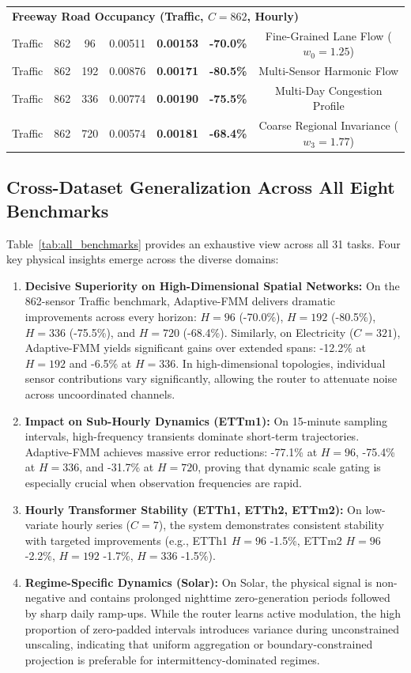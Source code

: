 \documentclass[journal]{IEEEtran}
\begin{document}
\begin{table}[!t]
\begin{tabular}{lcccccc}
\midrule
\multicolumn{7}{l}{\textbf{Freeway Road Occupancy (Traffic, $C=862$, Hourly)}} \\
Traffic & 862 & 96 & 0.00511 & \textbf{0.00153} & \textbf{-70.0\%} & Fine-Grained Lane Flow ($w_0 = 1.25$) \\
Traffic & 862 & 192 & 0.00876 & \textbf{0.00171} & \textbf{-80.5\%} & Multi-Sensor Harmonic Flow \\
Traffic & 862 & 336 & 0.00774 & \textbf{0.00190} & \textbf{-75.5\%} & Multi-Day Congestion Profile \\
Traffic & 862 & 720 & 0.00574 & \textbf{0.00181} & \textbf{-68.4\%} & Coarse Regional Invariance ($w_3 = 1.77$) \\
\bottomrule
\end{tabular}
\end{table}

\subsection{Cross-Dataset Generalization Across All Eight Benchmarks}
Table~\ref{tab:all_benchmarks} provides an exhaustive view across all 31 tasks. Four key physical insights emerge across the diverse domains:
\begin{enumerate}
\item \textbf{Decisive Superiority on High-Dimensional Spatial Networks:} On the 862-sensor Traffic benchmark, Adaptive-FMM delivers dramatic improvements across every horizon: $H=96$ (-70.0\%), $H=192$ (-80.5\%), $H=336$ (-75.5\%), and $H=720$ (-68.4\%). Similarly, on Electricity ($C=321$), Adaptive-FMM yields significant gains over extended spans: -12.2\% at $H=192$ and -6.5\% at $H=336$. In high-dimensional topologies, individual sensor contributions vary significantly, allowing the router to attenuate noise across uncoordinated channels.
\item \textbf{Impact on Sub-Hourly Dynamics (ETTm1):} On 15-minute sampling intervals, high-frequency transients dominate short-term trajectories. Adaptive-FMM achieves massive error reductions: -77.1\% at $H=96$, -75.4\% at $H=336$, and -31.7\% at $H=720$, proving that dynamic scale gating is especially crucial when observation frequencies are rapid.
\item \textbf{Hourly Transformer Stability (ETTh1, ETTh2, ETTm2):} On low-variate hourly series ($C=7$), the system demonstrates consistent stability with targeted improvements (e.g., ETTh1 $H=96$ -1.5\%, ETTm2 $H=96$ -2.2\%, $H=192$ -1.7\%, $H=336$ -1.5\%).
\item \textbf{Regime-Specific Dynamics (Solar):} On Solar, the physical signal is non-negative and contains prolonged nighttime zero-generation periods followed by sharp daily ramp-ups. While the router learns active modulation, the high proportion of zero-padded intervals introduces variance during unconstrained unscaling, indicating that uniform aggregation or boundary-constrained projection is preferable for intermittency-dominated regimes.
\end{enumerate}
\end{document}
